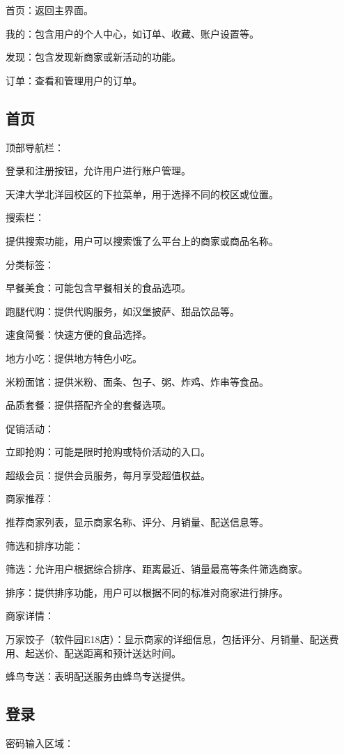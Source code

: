     首页：返回主界面。

    我的：包含用户的个人中心，如订单、收藏、账户设置等。

    发现：包含发现新商家或新活动的功能。

    订单：查看和管理用户的订单。
\subsection{首页}

    顶部导航栏：

    登录和注册按钮，允许用户进行账户管理。

    天津大学北洋园校区的下拉菜单，用于选择不同的校区或位置。

    搜索栏：

    提供搜索功能，用户可以搜索饿了么平台上的商家或商品名称。

    分类标签：

    早餐美食：可能包含早餐相关的食品选项。

    跑腿代购：提供代购服务，如汉堡披萨、甜品饮品等。

    速食简餐：快速方便的食品选择。

    地方小吃：提供地方特色小吃。

    米粉面馆：提供米粉、面条、包子、粥、炸鸡、炸串等食品。

    品质套餐：提供搭配齐全的套餐选项。

    促销活动：

    立即抢购：可能是限时抢购或特价活动的入口。

    超级会员：提供会员服务，每月享受超值权益。

    商家推荐：

    推荐商家列表，显示商家名称、评分、月销量、配送信息等。

    筛选和排序功能：

    筛选：允许用户根据综合排序、距离最近、销量最高等条件筛选商家。

    排序：提供排序功能，用户可以根据不同的标准对商家进行排序。

    商家详情：

    万家饺子（软件园E18店）：显示商家的详细信息，包括评分、月销量、配送费用、起送价、配送距离和预计送达时间。

    蜂鸟专送：表明配送服务由蜂鸟专送提供。
\subsection{登录}

    密码输入区域：

